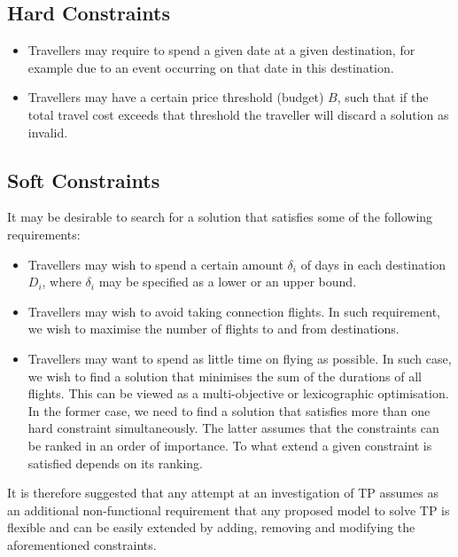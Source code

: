 \documentclass{article}
\theoremstyle{definition}
\begin{document}
\subsection{Hard Constraints}

\begin{itemize}

\item Travellers may require to spend a given date at a given destination, for example due to an event occurring on that date in this destination.

\item Travellers may have a certain price threshold (budget) $B$, such that if the total travel cost exceeds that threshold the traveller will discard a solution as invalid.

\end{itemize}

\subsection{Soft Constraints}
It may be desirable to search for a solution that satisfies some of the following requirements:

\begin{itemize}

\item Travellers may wish to spend a certain amount $\delta_{i}$ of days in each destination $D_{i}$, where $\delta_{i}$ may be specified as a lower or an upper bound.

\item Travellers may wish to avoid taking connection flights. In such requirement, we wish to maximise the number of flights to and from destinations.

\item Travellers may want to spend as little time on flying as possible. In such case, we wish to find a solution that minimises the sum of the durations of all flights. This can be viewed as a multi-objective or lexicographic optimisation. In the former case, we need to find a solution that satisfies more than one hard constraint simultaneously. The latter assumes that the constraints can be ranked in an order of importance. To what extend a given constraint is satisfied depends on its ranking.

\end{itemize}

It is therefore suggested that any attempt at an investigation of TP assumes as an additional non-functional requirement that any proposed model to solve TP is flexible and can be easily extended by adding, removing and modifying the aforementioned constraints.
\end{document}
